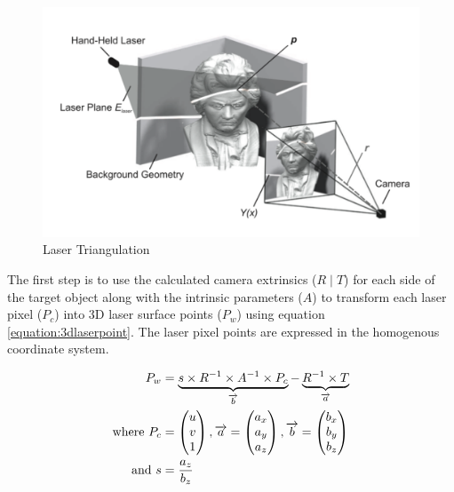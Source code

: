\begin{figure}[ht!]
\centering
\includegraphics[width=0.9\linewidth]{figures/pointcloudpaper}
\caption{Laser Triangulation \cite{winkelbach:2006}}
\label{figure:triangulation}
\end{figure}

The first step is to use the calculated camera extrinsics ($R \mid T$) for
each side of the target object along with the intrinsic parameters ($A$) to
transform each laser pixel ($P_c$) into 3D laser surface points ($P_w$) using
equation \ref{equation:3dlaserpoint}. The laser pixel points are expressed in
the homogenous coordinate system.

\begin{align}
	\label{equation:3dlaserpoint}
	P_w &= 	\underbrace{s \times R^{-1}
 					 							\times A^{-1}
 												\times P_c
										 }_\text{$\overrightarrow{b}$}
					-
					\underbrace{
											R^{-1} \times T
										 }_\text{$\overrightarrow{a}$} \\
	\text{where}~
	P_c &= \begin{pmatrix}
						u \\
						v \\
						1 \\
				 \end{pmatrix},
	\overrightarrow{a} = \begin{pmatrix}
													a_x \\
													a_y \\
													a_z \\
												\end{pmatrix},
	\overrightarrow{b} = \begin{pmatrix}
													b_x \\
													b_y \\
													b_z \\
												\end{pmatrix} \notag \\
  \text{and}~ s &= \frac{a_z}{b_z} \notag
\end{align}

